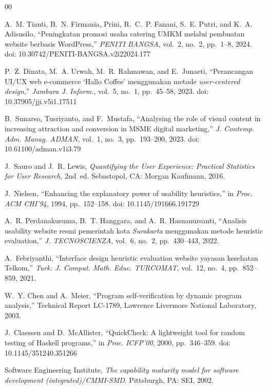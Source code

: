\documentclass[conference]{IEEEtran}
\begin{document}
\footnotesize
\begin{thebibliography}{00}

A.~M. Tianti, B.~N. Firmania, Prini, R.~C.~P. Fanani, S.~E. Putri, and K.~A. Adisusilo,
``Peningkatan promosi usaha catering UMKM melalui pembuatan website berbasis WordPress,''
\textit{PENITI BANGSA}, vol.~2, no.~2, pp.~1--8, 2024.
doi: 10.30742/PENITI-BANGSA.v2i22024.177

P.~Z. Dinata, M.~A. Urwah, M.~R. Rahmawan, and E.~Junaeti, ``Perancangan UI/UX web e-commerce
`Hallo Coffee' menggunakan metode \emph{user-centered design},'' \textit{Jambura J. Inform.},
vol.~5, no.~1, pp.~45--58, 2023. doi: 10.37905/jji.v5i1.17511

B.~Sunarso, Tusriyanto, and F.~Mustafa, ``Analysing the role of visual content in increasing
attraction and conversion in MSME digital marketing,'' \textit{J. Contemp. Adm. Manag. ADMAN},
vol.~1, no.~3, pp.~193--200, 2023. doi: 10.61100/adman.v1i3.79

J.~Sauro and J.~R. Lewis, \emph{Quantifying the User Experience: Practical Statistics for User
Research}, 2nd~ed. Sebastopol, CA: Morgan Kaufmann, 2016.

J.~Nielsen, ``Enhancing the explanatory power of usability heuristics,'' in \emph{Proc. ACM CHI'94},
1994, pp.~152--158. doi: 10.1145/191666.191729

A.~R. Perdanakusuma, B.~T. Hanggara, and A.~R. Hasnanursanti, ``Analisis usability website resmi
pemerintah kota \emph{Surakarta} menggunakan metode heuristic evaluation,'' \textit{J. TECNOSCIENZA},
vol.~6, no.~2, pp.~430--443, 2022.

A.~Febriyanthi, ``Interface design heuristic evaluation website yayasan kesehatan Telkom,''
\textit{Turk. J. Comput. Math. Educ. TURCOMAT}, vol.~12, no.~4, pp.~852--859, 2021.

W.~Y. Chen and A.~Meier, ``Program self-verification by dynamic program analysis,'' Technical
Report LC-1789, Lawrence Livermore National Laboratory, 2003.

J.~Claessen and D.~McAllister, ``QuickCheck: A lightweight tool for random testing of Haskell
programs,'' in \emph{Proc. ICFP'00}, 2000, pp.~346--359. doi: 10.1145/351240.351266

Software Engineering Institute, \emph{The capability maturity model for software development
(integrated)/CMMI-SMD}. Pittsburgh, PA: SEI, 2002.


\end{thebibliography}
\end{document}
